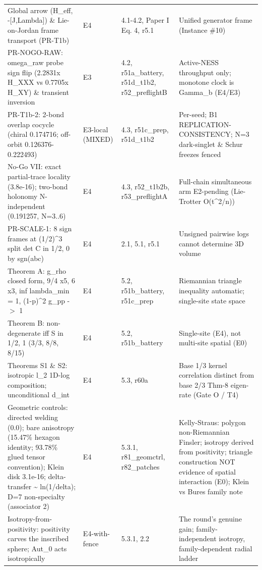 \documentclass[11pt,a4paper]{article}
\theoremstyle{definition}
\begin{document}
\begin{center}
\begin{tabularx}{\linewidth}{l X X X}
Global arrow (H\_eff, -[J,Lambda]) \& Lie-on-Jordan frame transport (PR-T1b) & E4 & 4.1-4.2, Paper I Eq. 4, r5.1 & Unified generator frame (Instance \#10) \\
PR-NOGO-RAW: omega\_raw probe sign flip (2.2831x H\_XXX vs 0.7705x H\_XY) \& transient inversion & E3 & 4.2, r51a\_battery, r51d\_t1b2, r52\_preflightB & Active-NESS throughput only; monotone clock is Gamma\_b (E4/E3) \\
PR-T1b-2: 2-bond overlap cocycle (chiral 0.174716; off-orbit 0.126376-0.222493) & E3-local (MIXED) & 4.3, r51c\_prep, r51d\_t1b2 & Per-seed; B1 REPLICATION-CONSISTENCY; N=3 dark-singlet \& Schur freezes fenced \\
No-Go VII: exact partial-trace locality (3.8e-16); two-bond holonomy N-independent (0.191257, N=3..6) & E4 & 4.3, r52\_t1b2b, r53\_preflightA & Full-chain simultaneous arm E2-pending (Lie-Trotter O(t\^{}2/n)) \\
PR-SCALE-1: 8 sign frames at (1/2)\^{}3 split det C in {1/2, 0} by sgn(abc) & E4 & 2.1, 5.1, r5.1 & Unsigned pairwise logs cannot determine 3D volume \\
Theorem A: g\_rho closed form, {9/4 x5, 6 x3}, inf lambda\_min = 1, (1-p)\^{}2 g\_pp -$>$ 1 & E4 & 5.2, r51b\_battery, r51c\_prep & Riemannian triangle inequality automatic; single-site state space \\
Theorem B: non-degenerate iff S in {1/2, 1} (3/3, 8/8, 8/15) & E4 & 5.2, r51b\_battery & Single-site (E4), not multi-site spatial (E0) \\
Theorems S1 \& S2: isotropic l\_2 1D-log composition; unconditional d\_int & E4 & 5.3, r60a & Base 1/3 kernel correlation distinct from base 2/3 Thm-8 eigen-rate (Gate O / T4) \\
Geometric controls: directed welding (0.0); bare anisotropy (15.47\% hexagon identity; 93.78\% glued tensor convention); Klein disk 3.1e-16; delta-transfer \textasciitilde{} ln(1/delta); D=7 non-specialty (associator 2) & E4 & 5.3.1, r81\_geomctrl, r82\_patches & Kelly-Straus: polygon non-Riemannian Finsler; isotropy derived from positivity; triangle construction NOT evidence of spatial interaction (E0); Klein vs Bures family note \\
Isotropy-from-positivity: positivity carves the inscribed sphere; Aut\_0 acts isotropically & E4-with-fence & 5.3.1, 2.2 & The round's genuine gain; family-independent isotropy, family-dependent radial ladder \\
\bottomrule
\end{tabularx}
\end{center}
\end{document}
